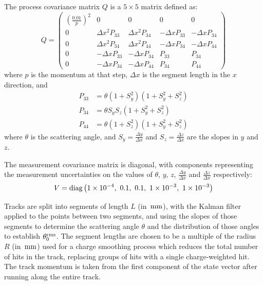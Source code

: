 The process covariance matrix $Q$ is a $5\times 5$ matrix defined as:\citep{Wolin1993}
\begin{equation}\label{eqn:kalman_process_covariance_matrix}
    Q = \left(
    \begin{array}{ccccc}

        \left(\frac{0.01}{p}\right)^2 &                 0 &                 0 &                0 &                0 \\
                                    0 & \Delta x^2 P_{33} & \Delta x^2 P_{34} & -\Delta x P_{33} & -\Delta x P_{34} \\
                                    0 & \Delta x^2 P_{34} & \Delta x^2 P_{44} & -\Delta x P_{34} & -\Delta x P_{44} \\
                                    0 & -\Delta x P_{33}  & -\Delta x P_{34}  & P_{33}           & P_{34}           \\
                                    0 & -\Delta x P_{34}  & -\Delta x P_{44}  & P_{34}           & P_{44}           

    \end{array}
    \right)
\end{equation}
where $p$ is the momentum at that step, $\Delta x$ is the segment length in the $x$ direction, and
\begin{align*}
    P_{33} &= \theta (1 + S_y^2)(1 + S_y^2 + S_z^2) \\
    P_{34} &= \theta S_y S_z(1 + S_y^2 + S_z^2) \\
    P_{44} &= \theta (1 + S_z^2)(1 + S_y^2 + S_z^2)
\end{align*}
where $\theta$ is the scattering angle, and $\displaystyle S_y=\frac{\Delta y}{\Delta x}$ and $\displaystyle S_z = \frac{\Delta z}{\Delta x}$ are the slopes in $y$ and $z$.

The measurement covariance matrix is diagonal, with components representing the measurement uncertainties on the values of $\theta$, $y$, $z$, $\displaystyle\frac{\Delta y}{\Delta x}$ and $\displaystyle\frac{\Delta z}{\Delta x}$ respectively:
\begin{equation}\label{eqn:kalman_measurement_covariance_matrix}
    V = \mathrm{diag} \left( 1\times10^{-4}, ~ 0.1, ~ 0.1, ~ 1\times10^{-3}, ~ 1\times10^{-3} \right)
\end{equation}

Tracks are split into segments of length $L$ (in $\,\mathrm{mm}$), with the Kalman filter applied to the points between two segments, and using the slopes of those segments to determine the scattering angle $\theta$ and the distribution of those angles to establish $\theta_0^{\mathrm{rms}}$. The segment lengths are chosen to be a multiple of the radius $R$ (in $\,\mathrm{mm}$) used for a charge smoothing process which reduces the total number of hits in the track, replacing groups of hits with a single charge-weighted hit. The track momentum is taken from the first component of the state vector after running along the entire track.

